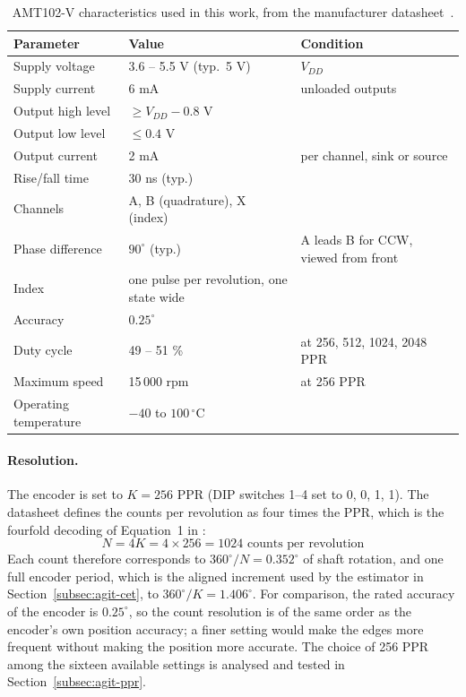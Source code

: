 \begin{table}[htbp]
    \centering
    \caption[AMT102-V characteristics]{AMT102-V characteristics used in this work, from the manufacturer datasheet~\citep{sameskyamt10}.}
    \label{tab:amt102}
    \small
    \begin{tabular}{@{}p{}p{}p{}@{}}
        \toprule
        Parameter & Value & Condition \\
        \midrule
        Supply voltage & 3.6 -- 5.5 V (typ.\ 5 V) & $V_{DD}$ \\
        Supply current & 6 mA & unloaded outputs \\
        Output high level & $\geq V_{DD} - 0.8$ V & \\
        Output low level & $\leq 0.4$ V & \\
        Output current & 2 mA & per channel, sink or source \\
        Rise/fall time & 30 ns (typ.) & \\
        Channels & A, B (quadrature), X (index) & \\
        Phase difference & $90^{\circ}$ (typ.) & A leads B for CCW, viewed from front \\
        Index & one pulse per revolution, one state wide & \\
        Accuracy & $0.25^{\circ}$ & \\
        Duty cycle & 49 -- 51 \% & at 256, 512, 1024, 2048 PPR \\
        Maximum speed & 15\,000 rpm & at 256 PPR \\
        Operating temperature & $-40$ to $100\,^{\circ}$C & \\
        \bottomrule
    \end{tabular}
\end{table}

\paragraph{Resolution.}
The encoder is set to $K = 256$ PPR (DIP switches 1--4 set to 0, 0, 1, 1). The datasheet defines the counts per revolution as four times the PPR, which is the fourfold decoding of Equation~1 in \citet{anuchin2019}:
\begin{equation}
    N = 4K = 4 \times 256 = 1024 \text{ counts per revolution}
    \label{eq:cpr}
\end{equation}
Each count therefore corresponds to $360^{\circ}/N = 0.352^{\circ}$ of shaft rotation, and one full encoder period, which is the aligned increment used by the estimator in Section~\ref{subsec:agit-cet}, to $360^{\circ}/K = 1.406^{\circ}$. For comparison, the rated accuracy of the encoder is $0.25^{\circ}$, so the count resolution is of the same order as the encoder's own position accuracy; a finer setting would make the edges more frequent without making the position more accurate. The choice of 256 PPR among the sixteen available settings is analysed and tested in Section~\ref{subsec:agit-ppr}.

